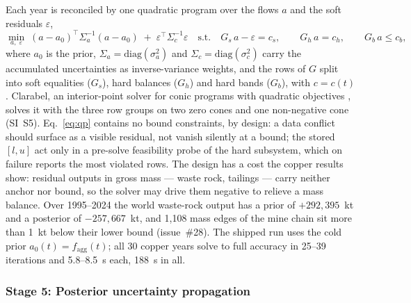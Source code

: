 Each year is reconciled by one quadratic program over the flows $a$ and the
soft residuals $\varepsilon$,
\begin{equation}
\min_{a,\;\varepsilon}\;
(a - a_0)^{\top} \Sigma_a^{-1} (a - a_0)
\;+\; \varepsilon^{\top} \Sigma_c^{-1} \varepsilon
\quad \text{s.t.} \quad
G_s\, a - \varepsilon = c_s, \qquad
G_h\, a = c_h, \qquad
G_b\, a \le c_b,
\label{eq:qp}
\end{equation}
where $a_0$ is the prior, $\Sigma_a = \mathrm{diag}(\sigma_a^2)$ and
$\Sigma_c = \mathrm{diag}(\sigma_c^2)$ carry the accumulated uncertainties as
inverse-variance weights, and the rows of $G$ split into soft equalities
($G_s$), hard balances ($G_h$) and hard bands ($G_b$), with $c = c(t)$.
Clarabel, an interior-point solver for conic programs with quadratic
objectives \citep{goulart2024clarabel}, solves it with the three row groups
on two zero cones and one non-negative cone (SI~S5). Eq.~\eqref{eq:qp}
contains no bound constraints, by design: a data conflict should surface as
a visible residual, not vanish silently at a bound; the stored $[l,u]$ act
only in a pre-solve feasibility probe of the hard subsystem, which on
failure reports the most violated rows. The design has a cost the copper
results show: residual outputs in gross mass --- waste rock, tailings ---
carry neither anchor nor bound, so the solver may drive them negative to
relieve a mass balance. Over 1995--2024 the world waste-rock output has a
prior of $+292{,}395$~kt and a posterior of $-257{,}667$~kt, and 1{,}108
mass edges of the mine chain sit more than 1~kt below their lower bound
(issue~\#28). The shipped run uses the cold prior $a_0(t) =
f_{\mathrm{agg}}(t)$; all 30 copper years solve to full accuracy in 25--39
iterations and 5.8--8.5~s each, 188~s in all.

\subsubsection{Stage 5: Posterior uncertainty propagation}\label{sec:stage5}

